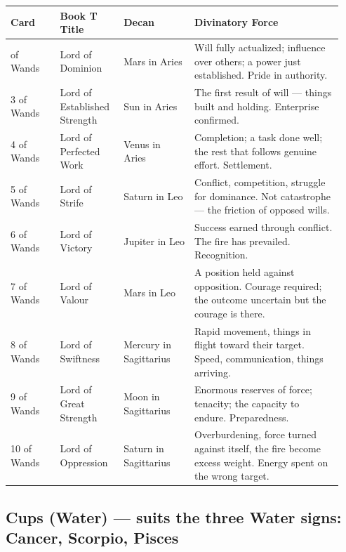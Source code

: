 \begin{longtable}[]{@{}>{\RaggedRight\small}p{0.14\linewidth}>{\RaggedRight\small}p{0.18\linewidth}>{\RaggedRight\small}p{0.20\linewidth}>{\RaggedRight\small}p{0.42\linewidth}@{}}
\toprule\noalign{}
Card & Book T Title & Decan & Divinatory Force \\
\midrule\noalign{}
\endhead
\bottomrule\noalign{}
\endlastfoot
2 of Wands & Lord of Dominion & Mars in Aries & Will fully actualized; influence over others; a power just established. Pride in authority. \\
3 of Wands & Lord of Established Strength & Sun in Aries & The first result of will --- things built and holding. Enterprise confirmed. \\
4 of Wands & Lord of Perfected Work & Venus in Aries & Completion; a task done well; the rest that follows genuine effort. Settlement. \\
5 of Wands & Lord of Strife & Saturn in Leo & Conflict, competition, struggle for dominance. Not catastrophe --- the friction of opposed wills. \\
6 of Wands & Lord of Victory & Jupiter in Leo & Success earned through conflict. The fire has prevailed. Recognition. \\
7 of Wands & Lord of Valour & Mars in Leo & A position held against opposition. Courage required; the outcome uncertain but the courage is there. \\
8 of Wands & Lord of Swiftness & Mercury in Sagittarius & Rapid movement, things in flight toward their target. Speed, communication, things arriving. \\
9 of Wands & Lord of Great Strength & Moon in Sagittarius & Enormous reserves of force; tenacity; the capacity to endure. Preparedness. \\
10 of Wands & Lord of Oppression & Saturn in Sagittarius & Overburdening, force turned against itself, the fire become excess weight. Energy spent on the wrong target. \\
\end{longtable}

\subsection{Cups (Water) --- suits the three Water signs: Cancer, Scorpio, Pisces}\label{cups-water--suits-the-three-water-signs-cancer-scorpio-pisces}


